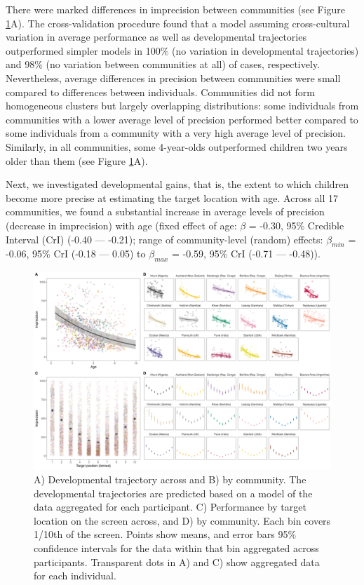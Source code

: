 \documentclass[
  man,floatsintext]{apa7}
\begin{document}
There were marked differences in imprecision between communities (see Figure \ref{fig:fig2}A). The cross-validation procedure found that a model assuming cross-cultural variation in average performance as well as developmental trajectories outperformed simpler models in 100\% (no variation in developmental trajectories) and 98\% (no variation between communities at all) of cases, respectively. Nevertheless, average differences in precision between communities were small compared to differences between individuals. Communities did not form homogeneous clusters but largely overlapping distributions: some individuals from communities with a lower average level of precision performed better compared to some individuals from a community with a very high average level of precision. Similarly, in all communities, some 4-year-olds outperformed children two years older than them (see Figure \ref{fig:fig2}A).

Next, we investigated developmental gains, that is, the extent to which children become more precise at estimating the target location with age. Across all 17 communities, we found a substantial increase in average levels of precision (decrease in imprecision) with age (fixed effect of age: \(\beta\) = -0.30, 95\% Credible Interval (CrI) (-0.40 --- -0.21); range of community-level (random) effects: \(\beta_{min}\) = -0.06, 95\% CrI (-0.18 --- 0.05) to \(\beta_{max}\) = -0.59, 95\% CrI (-0.71 --- -0.48)).

\begin{figure}
\includegraphics[width=1\linewidth]{../figures/pvis_pred} \caption{A) Developmental trajectory across and B) by community. The developmental trajectories are predicted based on a model of the data aggregated for each participant. C) Performance by target location on the screen across, and D) by community. Each bin covers 1/10th of the screen. Points show means, and error bars 95\% confidence intervals for the data within that bin aggregated across participants. Transparent dots in A) and C) show aggregated data for each individual.}\label{fig:fig2}
\end{figure}
\end{document}
